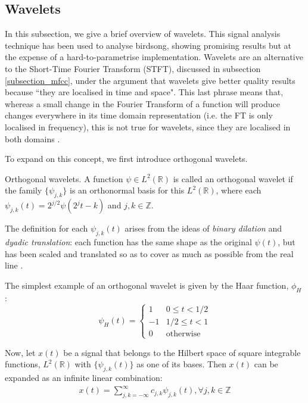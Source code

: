 \documentclass[../main.tex]{subfiles} \label{chapter_soa}
\begin{document}
\subsection{Wavelets} \label{subsection_wavelets}
In this subsection, we give a brief overview of wavelets. This signal analysis technique has been used to analyse birdsong, showing promising results \cite{Chou2009} but at the expense of a hard-to-parametrise implementation. Wavelets are an alternative to the Short-Time Fourier Transform (STFT), discussed in subsection \ref{subsection_mfcc}, under the argument that wavelets give better quality results because ``they are localised in time and space". This last phrase means that, whereas a small change in the Fourier Transform of a function will produce changes everywhere in its time domain representation (i.e. the FT is only localised in frequency), this is not true for wavelets, since they are localised in both domains \cite{Vidakovic1991}.
\par To expand on this concept, we first introduce orthogonal wavelets.
\begin{definition}{Orthogonal wavelets.} \label{def_onwavelets}
A function $\psi\in L^2(\mathbb{R})$ is called an orthogonal wavelet if the family $\{\psi_{j,k}\}$ is an orthonormal basis for this $L^2(\mathbb{R})$, where each $\psi_{j,k}(t) = 2^{j/2}\psi(2^jt-k)$ and $j, k \in \mathbb{Z}$.
\end{definition}
\par The definition for each $\psi_{j,k}(t)$ arises from the ideas of \emph{binary dilation} and \emph{dyadic translation}: each function has the same shape as the original $\psi(t)$, but has been scaled and translated so as to cover as much as possible from the real line \cite{Chui1992}. 
\par The simplest example of an orthogonal wavelet is given by the Haar function, $\phi_H$ \cite{Chui1992}:
\begin{displaymath}
   \psi_H(t) = \left\{
     \begin{array}{lr}
      1 & 0 \leq t < 1/2 \\
      -1 & 1/2 \leq t < 1 \\
      0 & \text{otherwise} 
     \end{array}
   \right.
\end{displaymath}
\par Now, let $x(t)$ be a signal that belongs to the Hilbert space of square integrable functions, $L^2(\mathbb{R})$ with $\{\psi_{j,k}(t)\}$ as one of its bases. Then $x(t)$ can be expanded as an infinite linear combination:
\begin{align*}
x(t) = \sum_{j,k=-\infty}^{\infty}{c_{j,k}\psi_{j,k}(t)}, \forall j,k \in \mathbb{Z}
\end{align*}
\end{document}
